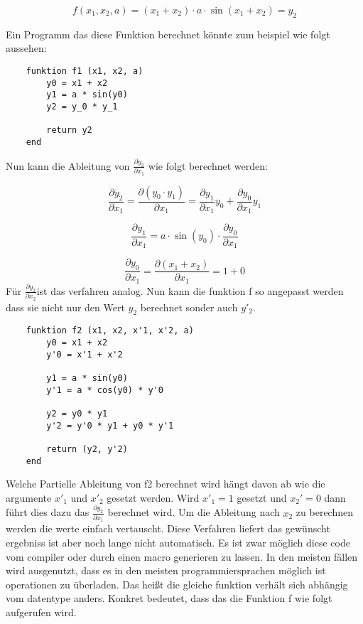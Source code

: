 $$
f(x_1, x_2, a) = (x_1 + x_2) \cdot a \cdot \sin(x_1 + x_2) = y_2
$$

Ein Programm das diese Funktion berechnet könnte zum beispiel wie folgt aussehen:

\begin{lstlisting}
    funktion f1 (x1, x2, a)
        y0 = x1 + x2
        y1 = a * sin(y0)
        y2 = y_0 * y_1
        
    	return y2
    end
\end{lstlisting}

Nun kann die Ableitung von $\frac{\partial y_2}{\partial x_1}$ wie folgt berechnet werden:

$$
	\frac{\partial y_2}{\partial x_1} = \frac{\partial (y_0 \cdot y_1)}{\partial x_1} = \frac{\partial  y_1}{\partial x_1} y_0  + \frac{\partial y_0 }{\partial x_1} y_1
$$

$$
	\frac{\partial y_1}{ \partial x_1 } = a \cdot \sin(y_0) \cdot \frac{\partial y_0}{\partial x_1}
$$

$$
	\frac{\partial y_0}{\partial x_1} = \frac{\partial (x_1 + x_2)}{\partial x_1} = 1 + 0
$$
Für $\frac{\partial y_2}{\partial x_2}$ist das verfahren analog. 
Nun kann die funktion f so angepasst werden dass sie nicht nur den Wert $y_2$ berechnet sonder auch $y'_2$.

\begin{lstlisting}
    funktion f2 (x1, x2, x'1, x'2, a)
        y0 = x1 + x2
        y'0 = x'1 + x'2

        y1 = a * sin(y0)
        y'1 = a * cos(y0) * y'0

		y2 = y0 * y1
        y'2 = y'0 * y1 + y0 * y'1
        
        return (y2, y'2)
    end
\end{lstlisting}

Welche Partielle Ableitung von f2 berechnet wird hängt davon ab wie die argumente $x'_1$ und $x'_2$ gesetzt werden.
Wird $x'_1 = 1$ gesetzt und $x_2' = 0$ dann führt dies dazu das $\frac{\partial y_2}{\partial x_1}$ berechnet wird.
Um die Ableitung nach $x_2$ zu berechnen werden die werte einfach vertauscht.
Diese Verfahren liefert das gewünscht ergebniss ist aber noch lange nicht automatisch.
Es ist zwar möglich diese code vom compiler oder durch einen macro generieren zu lassen.
In den meisten fällen wird ausgenutzt, dass es in den meisten 
programmiersprachen möglich ist operationen zu überladen.
Das heißt die gleiche funktion verhält sich abhängig vom datentype anders.
Konkret bedeutet, dass das die Funktion f wie folgt aufgerufen wird.

